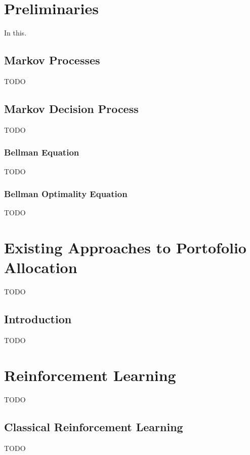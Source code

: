 \chapter{Preliminaries}
In this.


\section{Markov Processes}
TODO


\section{Markov Decision Process}
TODO

\subsection{Bellman Equation}
TODO

\subsection{Bellman Optimality Equation}
TODO



\chapter{Existing Approaches to Portofolio Allocation}
TODO


\section{Introduction}
TODO




\chapter{Reinforcement Learning}
TODO


\section{Classical Reinforcement Learning}
TODO


